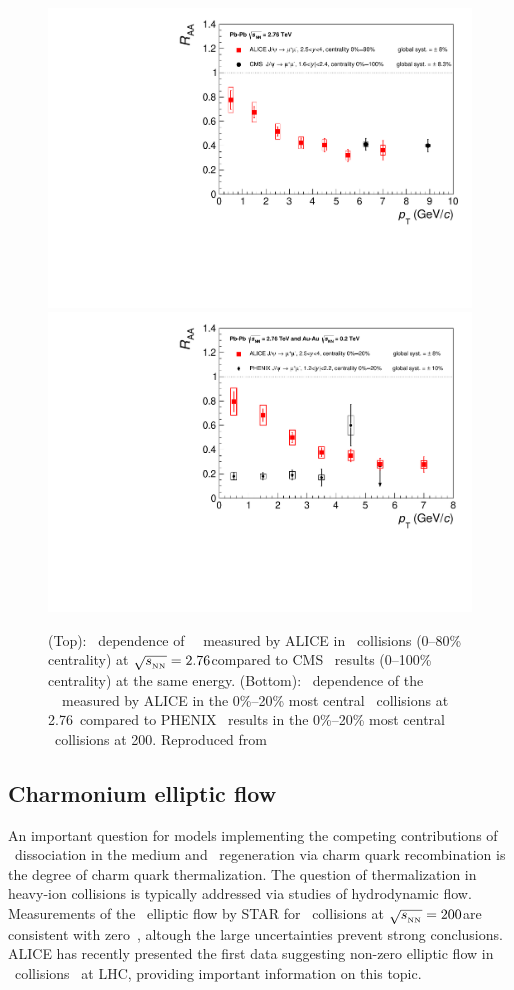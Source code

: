 \begin{figure}[h!]
\begin{center}
\includegraphics[width=0.49\linewidth,keepaspectratio]{qqbarfigures/RAAPtvsModels1.pdf}
\includegraphics[width=0.49\linewidth,keepaspectratio]{qqbarfigures/RAAPtvsModels2.pdf}
\caption{ \label{fig:GR:raaexp2}
(Top): \pT\ dependence of \jpsi\ \Raa\ measured by ALICE in \PbPb\
collisions (0--80\% centrality) at $\sqrt{s_{_{\rm NN}}} = 2.76$\TeV compared to CMS~\cite{Chatrchyan:2012np}
results (0--100\% centrality) at the same energy.
(Bottom): \pT\ dependence of the \jpsi\ \Raa\ measured by ALICE in the 0\%--20\% most
central \PbPb\ collisions at 2.76\TeV\ compared to PHENIX~\cite{Adare:2011yf}
results in the 0\%--20\% most central \AuAu\ collisions at 200\GeV. Reproduced from~\cite{Abelev:2013ila}}
\end{center}
\end{figure}


\subsection{Charmonium elliptic flow}

An important question for models implementing the competing contributions of
\jpsi\ dissociation in the medium and \jpsi\ regeneration via charm quark recombination is
the degree of charm quark thermalization. The question of thermalization in heavy-ion 
collisions is typically addressed
via studies of hydrodynamic flow. 
Measurements of the \jpsi\ elliptic flow by STAR for \AuAu\ collisions at 
$\sqrt{s_{_{\rm NN}}} = 200$\GeV are consistent with zero~\cite{Adamczyk:2012pw}, 
altough the large uncertainties prevent strong conclusions.
ALICE has recently presented the first data 
suggesting non-zero elliptic flow in \PbPb\ collisions~\cite{ALICE:2013xna} at LHC, 
providing important information on this topic.

